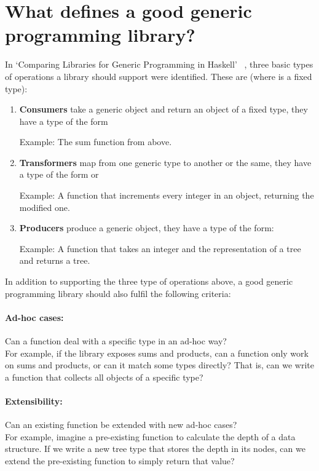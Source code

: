 \section*{What defines a good generic programming library?}
In `Comparing Libraries for Generic Programming in Haskell'~\cite{DBLP:conf/haskell/RodriguezJJGKO08}
, three basic types of operations a library should support were identified.
These are (where  is a fixed type):

\begin{enumerate}
    \item \textbf{Consumers} take a generic object and return an object of a fixed type, they have
           a type of the form 

           Example: The sum function from above.

    \item \textbf{Transformers} map from one generic type to another or the same, they have a type of the form
             or 

            Example: A function that increments every integer in an object, returning the modified one.

    \item \textbf{Producers} produce a generic object, they have a type of the form: 

            Example: A function that takes an integer and the representation of
                     a tree and returns a tree.
\end{enumerate}


In addition to supporting the three type of operations above, a good generic
programming library should also fulfil the following criteria:

\paragraph{Ad-hoc cases:} Can a function deal with a specific type in an ad-hoc way?
\\
For example, if the library exposes sums and products, can a function
only work on sums and products, or can it match some types directly? That is,
can we write a function that collects all objects of a specific type?

\paragraph{Extensibility:} Can an existing function be extended with new ad-hoc cases?
\\
For example, imagine a pre-existing function to calculate the depth of a data
structure. If we write a new tree type that stores the depth in its nodes, can
we extend the pre-existing function to simply return that value?

